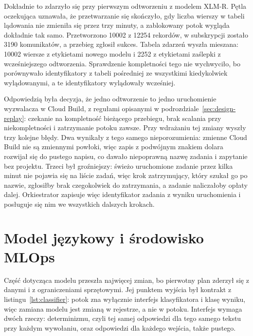 Dokładnie to zdarzyło się przy pierwszym odtworzeniu z modelem XLM-R.
Pętla oczekująca uznawała, że przetwarzanie się skończyło, gdy liczba wierszy w tabeli lądowania nie zmieniła się przez trzy minuty, a zablokowany potok wygląda dokładnie tak samo.
Przetworzono \num{10002} z \num{12254} rekordów, w subskrypcji zostało \num{3190} komunikatów, a przebieg zgłosił sukces.
Tabela zdarzeń wyszła mieszana: \num{10002} wiersze z etykietami nowego modelu i \num{2252} z etykietami zaślepki z wcześniejszego odtworzenia.
Sprawdzenie kompletności tego nie wychwyciło, bo porównywało identyfikatory z tabeli pośredniej ze wszystkimi kiedykolwiek wylądowanymi, a te identyfikatory wylądowały wcześniej.

Odpowiedzią była decyzja, że jedno odtworzenie to jedno uruchomienie wyzwalacza w Cloud Build, z regułami opisanymi w podrozdziale~\ref{sec:design-replay}: czekanie na kompletność bieżącego przebiegu, brak scalania przy niekompletności i zatrzymanie potoku zawsze.
Przy wdrażaniu tej zmiany wyszły trzy kolejne błędy.
Dwa wynikały z tego samego nieporozumienia: zmienne Cloud Build nie są zmiennymi powłoki, więc zapis z podwójnym znakiem dolara rozwijał się do pustego napisu, co dawało niepoprawną nazwę zadania i zapytanie bez projektu.
Trzeci był groźniejszy: świeżo uruchomione zadanie przez kilka minut nie pojawia się na liście zadań, więc krok zatrzymujący, który szukał go po nazwie, zgłosiłby brak czegokolwiek do zatrzymania, a zadanie naliczałoby opłaty dalej.
Orkiestrator zapisuje więc identyfikator zadania z wyniku uruchomienia i posługuje się nim we wszystkich dalszych krokach.

\section{Model językowy i środowisko MLOps}
\label{sec:impl-nlp}

Część dotycząca modelu przeszła najwięcej zmian, bo pierwotny plan zderzył się z danymi i z ograniczeniami sprzętowymi.
Jej punktem wyjścia był kontrakt z listingu~\ref{lst:classifier}: potok zna wyłącznie interfejs klasyfikatora i klasę wyniku, więc zamiana modelu jest zmianą w rejestrze, a nie w potoku.
Interfejs wymaga dwóch rzeczy: determinizmu, czyli tej samej odpowiedzi dla tego samego tekstu przy każdym wywołaniu, oraz odpowiedzi dla każdego wejścia, także pustego.



